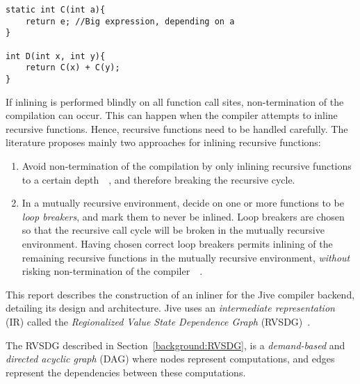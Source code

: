 \begin{centering}
	\noindent\begin{minipage}{\textwidth}
		\begin{CenteredBox}
		\begin{lstlisting}[style=global_customcpp]
static int C(int a){
	return e; //Big expression, depending on a
}

int D(int x, int y){
	return C(x) + C(y);
}
		\end{lstlisting}
		\end{CenteredBox}
	\end{minipage}
	\label{lst:code-dup}
\end{centering}

If inlining is performed blindly on all function call sites, non-termination of
the compilation can occur. This can happen when the compiler attempts to inline
recursive functions. Hence, recursive functions need to be handled carefully.
The literature proposes mainly two approaches for inlining recursive functions:

\begin{enumerate}

	\item Avoid non-termination of the compilation by only inlining recursive
functions to a certain depth~\cite{GHCPaper}~\cite{InlineWhenHowSerrano}, and
therefore breaking the recursive cycle.

	\item In a mutually recursive environment, decide on one or more functions
to be \textit{loop breakers}, and mark them to never be inlined. Loop breakers
are chosen so that the recursive call cycle will be broken in the mutually
recursive environment. Having chosen correct loop breakers permits inlining of
the remaining recursive functions in the mutually recursive environment,
\textit{without} risking non-termination of the
compiler~\cite{BasMscThesis}~\cite{GHCPaper}.

\end{enumerate}

This report describes the construction of an inliner for the Jive compiler
backend, detailing its design and architecture. Jive uses an
\textit{intermediate representation} (IR) called the \textit{Regionalized Value
State Dependence Graph} (RVSDG)~\cite{RVSDG:HiPEACpaper}.

The RVSDG described in Section~\ref{background:RVSDG},
is a \textit{demand-based} and \textit{directed acyclic graph} (DAG) where nodes
represent computations, and edges represent the dependencies between these
computations.

